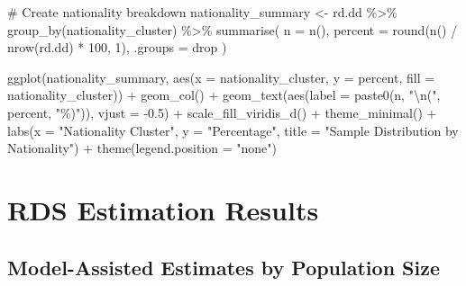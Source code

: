 \documentclass[
  12pt,
  letterpaper,
  DIV=11,
  numbers=noendperiod]{scrartcl}
\newenvironment{Shaded}{\begin{snugshade}}{\end{snugshade}}
\newcommand{\AttributeTok}[1]{\textcolor[rgb]{0.40,0.45,0.13}{#1}}
\newcommand{\CommentTok}[1]{\textcolor[rgb]{0.37,0.37,0.37}{#1}}
\newcommand{\DecValTok}[1]{\textcolor[rgb]{0.68,0.00,0.00}{#1}}
\newcommand{\FloatTok}[1]{\textcolor[rgb]{0.68,0.00,0.00}{#1}}
\newcommand{\FunctionTok}[1]{\textcolor[rgb]{0.28,0.35,0.67}{#1}}
\newcommand{\NormalTok}[1]{\textcolor[rgb]{0.00,0.23,0.31}{#1}}
\newcommand{\OtherTok}[1]{\textcolor[rgb]{0.00,0.23,0.31}{#1}}
\newcommand{\SpecialCharTok}[1]{\textcolor[rgb]{0.37,0.37,0.37}{#1}}
\newcommand{\StringTok}[1]{\textcolor[rgb]{0.13,0.47,0.30}{#1}}
\theoremstyle{plain}
\theoremstyle{definition}
\begin{document}
\begin{Shaded}
\begin{Highlighting}[]
\CommentTok{\# Create nationality breakdown}
\NormalTok{nationality\_summary }\OtherTok{\textless{}{-}}\NormalTok{ rd.dd }\SpecialCharTok{\%\textgreater{}\%}
  \FunctionTok{group\_by}\NormalTok{(nationality\_cluster) }\SpecialCharTok{\%\textgreater{}\%}
  \FunctionTok{summarise}\NormalTok{(}
    \AttributeTok{n =} \FunctionTok{n}\NormalTok{(),}
    \AttributeTok{percent =} \FunctionTok{round}\NormalTok{(}\FunctionTok{n}\NormalTok{() }\SpecialCharTok{/} \FunctionTok{nrow}\NormalTok{(rd.dd) }\SpecialCharTok{*} \DecValTok{100}\NormalTok{, }\DecValTok{1}\NormalTok{),}
    \AttributeTok{.groups =} \StringTok{\textquotesingle{}drop\textquotesingle{}}
\NormalTok{  )}

\FunctionTok{ggplot}\NormalTok{(nationality\_summary, }\FunctionTok{aes}\NormalTok{(}\AttributeTok{x =}\NormalTok{ nationality\_cluster, }\AttributeTok{y =}\NormalTok{ percent, }\AttributeTok{fill =}\NormalTok{ nationality\_cluster)) }\SpecialCharTok{+}
  \FunctionTok{geom\_col}\NormalTok{() }\SpecialCharTok{+}
  \FunctionTok{geom\_text}\NormalTok{(}\FunctionTok{aes}\NormalTok{(}\AttributeTok{label =} \FunctionTok{paste0}\NormalTok{(n, }\StringTok{"}\SpecialCharTok{\textbackslash{}n}\StringTok{("}\NormalTok{, percent, }\StringTok{"\%)"}\NormalTok{)), }\AttributeTok{vjust =} \SpecialCharTok{{-}}\FloatTok{0.5}\NormalTok{) }\SpecialCharTok{+}
  \FunctionTok{scale\_fill\_viridis\_d}\NormalTok{() }\SpecialCharTok{+}
  \FunctionTok{theme\_minimal}\NormalTok{() }\SpecialCharTok{+}
  \FunctionTok{labs}\NormalTok{(}\AttributeTok{x =} \StringTok{"Nationality Cluster"}\NormalTok{, }\AttributeTok{y =} \StringTok{"Percentage"}\NormalTok{, }
       \AttributeTok{title =} \StringTok{"Sample Distribution by Nationality"}\NormalTok{) }\SpecialCharTok{+}
  \FunctionTok{theme}\NormalTok{(}\AttributeTok{legend.position =} \StringTok{"none"}\NormalTok{)}
\end{Highlighting}
\end{Shaded}

\section{RDS Estimation Results}\label{rds-estimation-results}

\subsection{Model-Assisted Estimates by Population
Size}\label{model-assisted-estimates-by-population-size}
\end{document}
